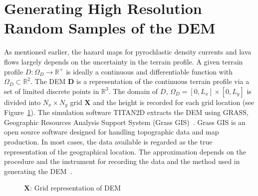 \section{Generating High Resolution Random Samples of the DEM}
\label{highres}
As mentioned earlier, the hazard maps for pyrochlastic density currents and lava flows largely depends on the uncertainty in the terrain profile. A given terrain profile $D:\Omega_{D} \rightarrow \mathbb{R}^+$ is ideally a continuous and differentiable function with $\Omega_D \subset \mathbb{R}^2$. The DEM $\textbf{D}$ is a representation of the continuous terrain profile via a set of limited discrete points in $\mathbb{R}^3$. The domain of $D$, $\Omega_D = [0,L_x] \times [0,L_y]$ is divided into $N_x \times N_y$ grid $\textbf{X}$ and the height is recorded for each grid location (see Figure~\ref{grid_dem}). The simulation software TITAN2D extracts the DEM using GRASS, Geographic Resources Analysis Support System (Grass GIS)~\cite{GRASS_GIS_software}. Grass GIS is an open source software designed for handling topographic data and map production. In most cases, the data available is regarded as the true representation of the geographical location. The approximation depends on the procedure and the instrument for recording the data and the method used in generating the DEM~\cite{petrie1987terrain}.

\begin{figure}[H]
\begin{center}
\hspace{2cm}
\caption{$\textbf{X}$: Grid representation of DEM}
\label{grid_dem}
\end{center}
\end{figure}


